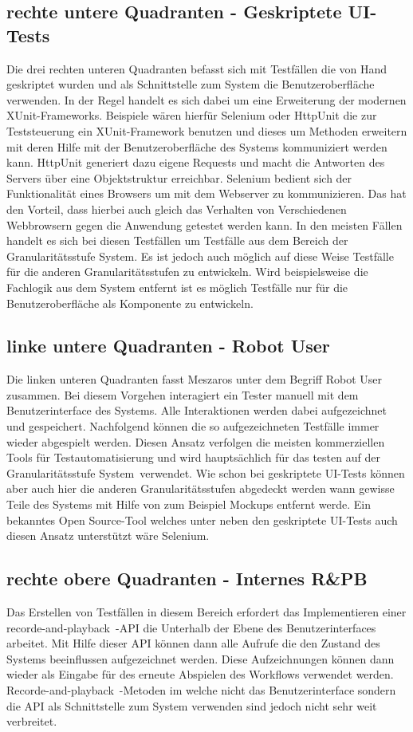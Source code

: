 \subsection{rechte untere Quadranten - Geskriptete UI-Tests}
Die drei rechten unteren Quadranten befasst sich mit Testfällen die von Hand geskriptet wurden und als Schnittstelle zum System die Benutzeroberfläche verwenden. In der Regel handelt es sich dabei um eine Erweiterung der modernen XUnit-Frameworks. Beispiele wären hierfür Selenium \cite{selenium_selenium_????} oder HttpUnit \cite{httpunit_httpunit_????} die zur Teststeuerung ein XUnit-Framework benutzen und dieses um Methoden erweitern mit deren Hilfe mit der Benutzeroberfläche des Systems kommuniziert werden kann. HttpUnit generiert dazu eigene Requests und macht die Antworten des Servers über eine Objektstruktur erreichbar. Selenium bedient sich der Funktionalität eines Browsers um mit dem Webserver zu kommunizieren. Das hat den Vorteil, dass hierbei auch gleich das Verhalten von Verschiedenen Webbrowsern gegen die Anwendung getestet werden kann. In den meisten Fällen handelt es sich bei diesen Testfällen um Testfälle aus dem Bereich der Granularitätsstufe \glqq System\grqq . Es ist jedoch auch möglich auf diese Weise Testfälle für die anderen Granularitätsstufen zu entwickeln. Wird beispielsweise die Fachlogik aus dem System entfernt ist es möglich Testfälle nur für die Benutzeroberfläche als Komponente zu entwickeln.

\subsection{linke untere Quadranten - Robot User}
Die linken unteren Quadranten fasst Meszaros unter dem Begriff \glqq Robot User\grqq\  \cite{meszaros_agile_2003} zusammen. Bei diesem Vorgehen interagiert ein Tester manuell mit dem Benutzerinterface des Systems. Alle Interaktionen werden dabei aufgezeichnet und gespeichert. Nachfolgend können die so aufgezeichneten Testfälle immer wieder abgespielt werden.
Diesen Ansatz verfolgen die meisten kommerziellen Tools für Testautomatisierung und wird hauptsächlich für das testen auf der Granularitätsstufe \glqq System\grqq\ verwendet.
Wie schon bei geskriptete UI-Tests können aber auch hier die anderen Granularitätsstufen abgedeckt werden wann gewisse Teile des Systems mit Hilfe von zum Beispiel Mockups entfernt werde.
Ein bekanntes Open Source-Tool welches unter neben den geskriptete UI-Tests auch diesen Ansatz unterstützt wäre Selenium.


\subsection{rechte obere Quadranten - Internes R\&PB}
Das Erstellen von Testfällen in diesem Bereich erfordert das Implementieren einer \glqq recorde-and-playback\grqq\ -API die Unterhalb der Ebene des Benutzerinterfaces arbeitet. Mit Hilfe dieser API können dann alle Aufrufe die den Zustand des Systems beeinflussen aufgezeichnet werden. Diese Aufzeichnungen können dann wieder als Eingabe für des erneute Abspielen des Workflows verwendet werden.
\glqq Recorde-and-playback\grqq\ -Metoden im welche nicht das Benutzerinterface sondern die API als Schnittstelle zum System verwenden sind jedoch nicht sehr weit verbreitet.
